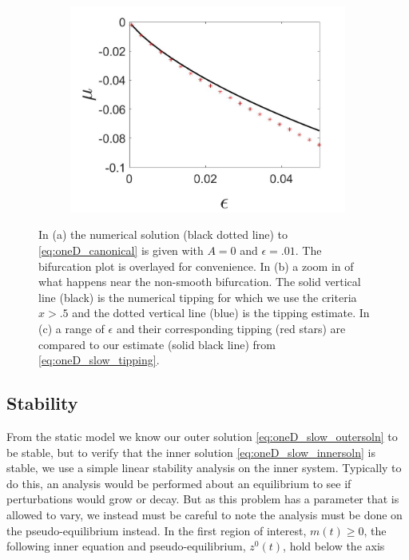 \begin{figure}[H]
\begin{subfigure}{.5\textwidth}
\includegraphics[width=\linewidth]{oneD/slow_epscomp.jpg}
\caption{}
\label{fig:oneD_slow_comp}
\end{subfigure}
\caption{In (a) the numerical solution (black dotted line) to \eqref{eq:oneD_canonical} is given with $A=0$ and $\epsilon=.01$. The bifurcation plot is overlayed for convenience. In (b) a zoom in of what happens near the non-smooth bifurcation. The solid vertical line (black) is the numerical tipping for which we use the criteria $x>.5$ and the dotted vertical line (blue) is the tipping estimate. In (c) a range of $\epsilon$ and their corresponding tipping (red stars) are compared to our estimate (solid black line) from \eqref{eq:oneD_slow_tipping}.}
\label{fig:oneD_slow_numerics}
\end{figure}


\subsection{Stability}
From the static model we know our outer solution \eqref{eq:oneD_slow_outersoln} to be stable, but to verify that the inner solution \eqref{eq:oneD_slow_innersoln} is stable, we use a simple linear stability analysis on the inner system. Typically to do this, an analysis would be performed about an equilibrium to see if perturbations would grow or decay. But as this problem has a parameter that is allowed to vary, we instead must be careful to note the analysis must be done on the pseudo-equilibrium instead. In the first region of interest, $m(t)\ge 0$, the following inner equation and pseudo-equilibrium, $z^0(t)$, hold below the axis

